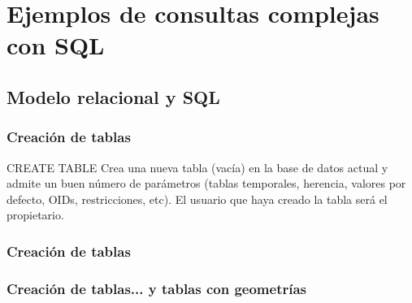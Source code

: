 \documentclass{classes/beamer_GeomaticaUA}
\begin{document}
\section[Consultas SQL]{Ejemplos de consultas complejas con SQL}
\subsection{Modelo relacional y SQL}




\begin{frame}[fragile]
\frametitle{Creación de tablas}

\begin{block}{CREATE TABLE}
Crea una nueva tabla (vacía) en la base de datos actual y admite un buen número de parámetros (tablas temporales, herencia, valores por defecto, OIDs, restricciones, etc). El usuario que haya creado la tabla será el propietario.
\end{block}



\end{frame}


\begin{frame}[fragile]
\frametitle{Creación de tablas}


\end{frame}


\begin{frame}[fragile]
\frametitle{Creación de tablas... y tablas con geometrías}






\end{frame}
\end{document}
